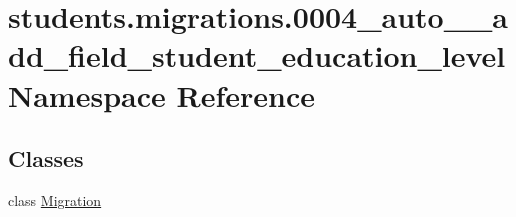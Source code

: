 \hypertarget{namespacestudents_1_1migrations_1_10004__auto____add__field__student__education__level}{\section{students.\-migrations.0004\-\_\-auto\-\_\-\-\_\-add\-\_\-field\-\_\-student\-\_\-education\-\_\-level Namespace Reference}
\label{namespacestudents_1_1migrations_1_10004__auto____add__field__student__education__level}
}
\subsection*{Classes}
\begin{DoxyCompactItemize}
\item 
class \hyperlink{classstudents_1_1migrations_1_10004__auto____add__field__student__education__level_1_1_migration}{Migration}
\end{DoxyCompactItemize}

